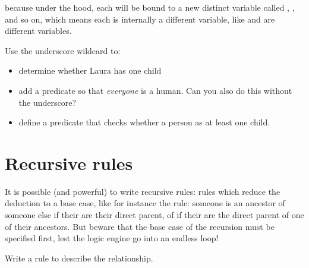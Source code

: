 \documentclass{../../../tp}
\begin{document}
because under the hood, each \prologcode{_} will be bound to a new distinct variable called , ,  and so on, which means each \prologcode{_} is internally a different variable, like  and  are different variables.

\begin{instruction}
	Use the underscore wildcard to:
	\begin{itemize}
		\item determine whether Laura has one child
		\item add a  predicate so that \emph{everyone} is a human. Can you also do this without the underscore?
		\item define a  predicate that checks whether a person as at least one child. 
	\end{itemize}
\end{instruction} 


\section{Recursive rules}

It is possible (and powerful) to write recursive rules: rules which reduce the deduction to a base case, like for instance the  rule: someone is an ancestor of someone else if their are their direct parent, of if their are the direct parent of one of their ancestors. But beware that the base case of the recursion must be specified first, lest the logic engine go into an endless loop!

\begin{instruction}
	Write a rule to describe the  relationship.
\end{instruction}
\end{document}
